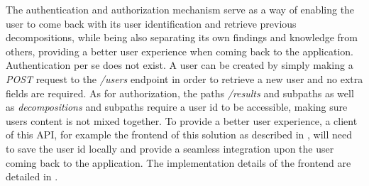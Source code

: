 The authentication and authorization mechanism serve as a way of enabling the user to come back with its user identification and retrieve previous decompositions, while being also separating its own findings and knowledge from others, providing a better user experience when coming back to the application.
Authentication per se does not exist. A user can be created by simply making a \textit{POST} request to the \textit{/users} endpoint in order to retrieve a new user and no extra fields are required. As for authorization, the paths \textit{/results} and subpaths as well as \textit{decompositions} and subpaths require a user id to be accessible, making sure users content is not mixed together.
To provide a better user experience, a client of this API, for example the frontend of this solution as described in , will need to save the user id locally and provide a seamless integration upon the user coming back to the application. The implementation details of the frontend are detailed in .
